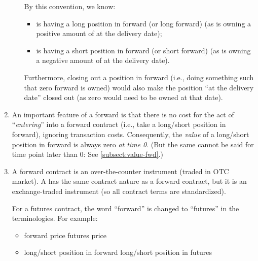 \begin{enumerate}
\begin{itemize}
By this convention, we know:
\begin{itemize}
\item {\color{violet}} is having a long position in forward (or
long forward) (as {\color{violet}} is owning a positive amount
of  at the delivery date);
\item {\color{orange}} is having a short position in forward
(or short forward) (as {\color{orange}} is owning a negative
amount of  at the delivery date).
\end{itemize}
Furthermore, closing out a position in forward (i.e., doing something such
that zero forward is owned) would also make the position ``at the delivery
date'' closed out (as zero  would need to be
owned at that date).
\end{itemize}

\item \label{it:fwd-cost-zero}
An important feature of a forward is that there is no cost for the act of
``\emph{entering}'' into a forward contract (i.e., take a long/short position
in forward), ignoring transaction costs. Consequently, the \emph{value} of a
long/short position in forward is always zero \emph{at time 0}. (But the same
cannot be said for time point later than 0: See \cref{subsect:value-fwd}.)


\item A forward contract is an over-the-counter instrument (traded in OTC
market). A  has the same contract nature as a forward
contract, but it is an exchange-traded instrument (so all contract terms are
standardized).

\begin{note}
For a futures contract, the word ``forward'' is changed to ``futures'' in the
terminologies. For example:
\begin{itemize}
\item forward price  futures price
\item long/short position in forward  long/short position
in futures
\end{itemize}
\end{note}
\end{enumerate}
